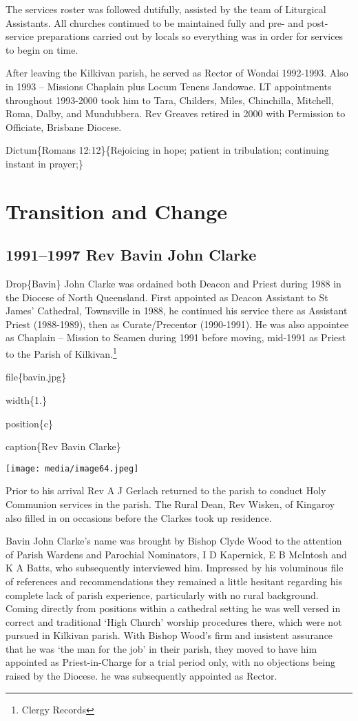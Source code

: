 The services roster was followed dutifully, assisted by the team of Liturgical Assistants. All churches continued to be maintained fully and pre- and post-service preparations carried out by locals so everything was in order for services to begin on time.

After leaving the Kilkivan parish, he served as Rector of Wondai 1992-1993. Also in 1993 -- Missions Chaplain plus Locum Tenens Jandowae. LT appointments throughout 1993-2000 took him to Tara, Childers, Miles, Chinchilla, Mitchell, Roma, Dalby, and Mundubbera. Rev Greaves retired in 2000 with Permission to Officiate, Brisbane Diocese.

Dictum\{Romans 12:12\}\{Rejoicing in hope; patient in tribulation; continuing instant in prayer;\}

\hypertarget{transition-and-change}{%
\chapter{Transition and Change}\label{transition-and-change}}

\hypertarget{rev-bavin-john-clarke}{%
\section{1991--1997 Rev Bavin John Clarke}\label{rev-bavin-john-clarke}}

Drop\{Bavin\} John Clarke was ordained both Deacon and Priest during 1988 in the Diocese of North Queensland. First appointed as Deacon Assistant to St James' Cathedral, Townsville in 1988, he continued his service there as Assistant Priest (1988-1989), then as Curate/Precentor (1990-1991). He was also appointee as Chaplain -- Mission to Seamen during 1991 before moving, mid-1991 as Priest to the Parish of Kilkivan.\footnote{Clergy Records}

file\{bavin.jpg\}

width\{1.\}

position\{c\}

caption\{Rev Bavin Clarke\}

\texttt{[image: media/image64.jpeg]}

Prior to his arrival Rev A J Gerlach returned to the parish to conduct Holy Communion services in the parish. The Rural Dean, Rev Wisken, of Kingaroy also filled in on occasions before the Clarkes took up residence.

Bavin John Clarke's name was brought by Bishop Clyde Wood to the attention of Parish Wardens and Parochial Nominators, I D Kapernick, E B McIntosh and K A Batts, who subsequently interviewed him. Impressed by his voluminous file of references and recommendations they remained a little hesitant regarding his complete lack of parish experience, particularly with no rural background. Coming directly from positions within a cathedral setting he was well versed in correct and traditional `High Church' worship procedures there, which were not pursued in Kilkivan parish. With Bishop Wood's firm and insistent assurance that he was `the man for the job' in their parish, they moved to have him appointed as Priest-in-Charge for a trial period only, with no objections being raised by the Diocese. he was subsequently appointed as Rector.


